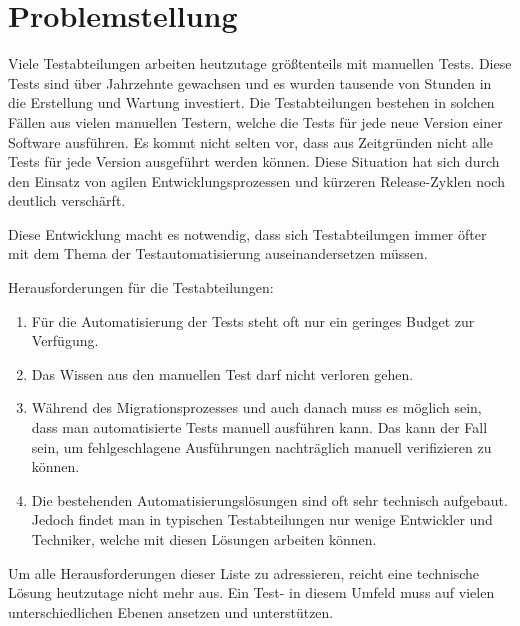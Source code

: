 
\section{Problemstellung}

Viele Testabteilungen arbeiten heutzutage größtenteils mit manuellen Tests. Diese Tests sind über Jahrzehnte gewachsen und es wurden tausende von Stunden in die Erstellung und Wartung investiert. Die Testabteilungen bestehen in solchen Fällen aus vielen manuellen Testern, welche die Tests für jede neue Version einer Software ausführen. Es kommt nicht selten vor, dass aus Zeitgründen nicht alle Tests für jede Version ausgeführt werden können. Diese Situation hat sich durch den Einsatz von agilen Entwicklungsprozessen und kürzeren Release-Zyklen noch deutlich verschärft. 

\SuperPar
Diese Entwicklung macht es notwendig, dass sich Testabteilungen immer öfter mit dem Thema der Testautomatisierung auseinandersetzen müssen. 

\SuperPar
Herausforderungen für die Testabteilungen:\\

\begin{enumerate}

\item Für die Automatisierung der Tests steht oft nur ein geringes Budget zur Verfügung.\\
	
\item Das Wissen aus den manuellen Test darf nicht verloren gehen.\\
	
\item Während des Migrationsprozesses und auch danach muss es möglich sein, dass man automatisierte Tests manuell ausführen kann. Das kann der Fall sein, um fehlgeschlagene Ausführungen nachträglich manuell verifizieren zu können.\\

\item Die bestehenden Automatisierungslösungen sind oft sehr technisch aufgebaut. Jedoch findet man in typischen Testabteilungen nur wenige Entwickler und Techniker, welche mit diesen Lösungen arbeiten können.

\end{enumerate}

\SuperPar
Um alle Herausforderungen dieser Liste zu adressieren, reicht eine technische Lösung heutzutage nicht mehr aus. Ein Test- in diesem Umfeld muss auf vielen unterschiedlichen Ebenen ansetzen und unterstützen. 

